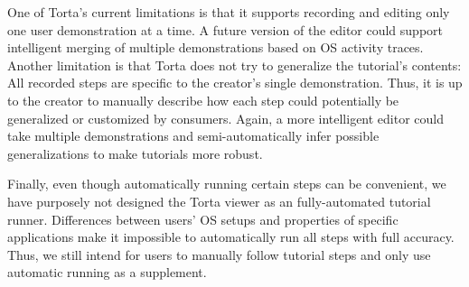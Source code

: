 One of Torta's current limitations is that it supports recording and
editing only one user demonstration at a time. A future version of the
editor could support intelligent merging of multiple demonstrations
based on OS activity traces. Another limitation is that Torta does not
try to generalize the tutorial's contents: All recorded steps are
specific to the creator's single demonstration. Thus, it is up to the
creator to manually describe how each step could potentially be
generalized or customized by consumers. Again, a more intelligent editor
could take multiple demonstrations and semi-automatically infer possible
generalizations to make tutorials more robust.

Finally, even though automatically running certain steps can be
convenient, we have purposely not designed the Torta viewer as an
fully-automated tutorial runner. Differences between users' OS
setups and properties of specific applications make it impossible to
automatically run all steps with full accuracy.
Thus,
we still intend for users to manually follow tutorial steps and
only use automatic running as a supplement.
